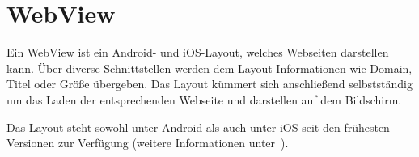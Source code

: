 \section{WebView}
Ein WebView ist ein Android- und iOS-Layout, welches Webseiten darstellen kann. Über diverse Schnittstellen werden dem
Layout Informationen wie Domain, Titel oder Größe übergeben. Das Layout kümmert sich anschließend selbstständig um das
Laden der entsprechenden Webseite und darstellen auf dem Bildschirm.

Das Layout steht sowohl unter Android als auch unter iOS seit den frühesten Versionen zur Verfügung (weitere
Informationen unter~\cite{online_grundlagen_webview}).